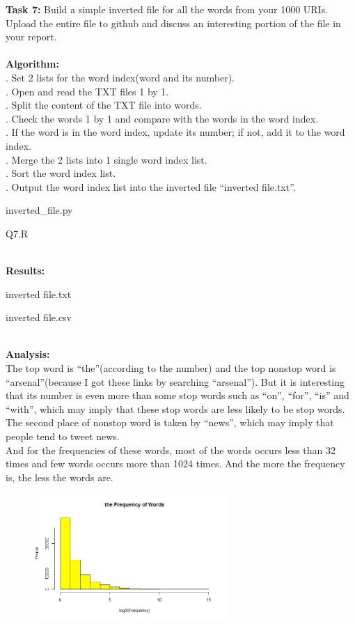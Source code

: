 \documentclass{article}
\begin{document}
		\textbf{Task 7: }Build a simple inverted file for all the words from your 1000 URIs. Upload the entire file to github and discuss an interesting portion of the file in your report.\\\\
		\textbf{Algorithm:}\\
		. Set 2 lists for the word index(word and its number).\\
		. Open and read the TXT files 1 by 1.\\
		. Split the content of the TXT file into words.\\
		. Check the words 1 by 1 and compare with the words in the word index.\\
		. If the word is in the word index, update its number; if not, add it to the word index.\\
		. Merge the 2 lists into 1 single word index list.\\
		. Sort the word index list.\\
		. Output the word index list into the inverted file ``inverted file.txt''.
		\begin{list}{\textbf{Source code:}}
			\item inverted\_file.py
		\end{list}
		\begin{list}{\textbf{R code:}}
			\item Q7.R
		\end{list}	
		\noindent\\\textbf{Results:}
		\begin{list}{}
			\item inverted file.txt
			\item inverted file.csv
		\end{list}
		\noindent\\\textbf{Analysis:}\\
		\indent The top word is ``the''(according to the number) and the top nonstop word is ``arsenal''(because I got these links by searching ``arsenal''). But it is interesting that its number is even more than some stop words such as ``on'', ``for'', ``is'' and ``with'', which may imply that these stop words are less likely to be stop words. The second place of nonstop word is taken by ``news'', which may imply that people tend to tweet news.\\
		\indent And for the frequencies of these words, most of the words occurs less than 32 times and few words occurs more than 1024 times. And the more the frequency is, the less the words are.
		\begin{figure}[h]
			\centering 
			\includegraphics[width=0.65\textwidth]{frequencyOfWords.png}
			\label{fig:frequency of words}
		\end{figure}
	
\end{document}
